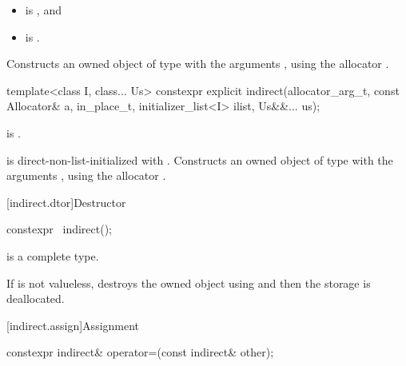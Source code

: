 \begin{itemdescr}
\pnum
\constraints
\begin{itemize}
\item
{} is , and
\item
{} is .
\end{itemize}

\pnum
\effects
Constructs an owned object of type  with the arguments
,
using the allocator .
\end{itemdescr}

%
\begin{itemdecl}
template<class I, class... Us>
  constexpr explicit indirect(allocator_arg_t, const Allocator& a,
                              in_place_t, initializer_list<I> ilist, Us&&... us);
\end{itemdecl}

\begin{itemdescr}
\pnum
\constraints
{} is .

\pnum
\effects
{} is direct-non-list-initialized with .
Constructs an owned object of type  with the arguments
,
using the allocator .
\end{itemdescr}

[indirect.dtor]{Destructor}

%
\begin{itemdecl}
constexpr ~indirect();
\end{itemdecl}

\begin{itemdescr}
\pnum
\mandates
{} is a complete type.

\pnum
\effects
If  is not valueless,
destroys the owned object
using  and
then the storage is deallocated.
\end{itemdescr}

[indirect.assign]{Assignment}

%
\begin{itemdecl}
constexpr indirect& operator=(const indirect& other);
\end{itemdecl}

